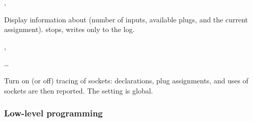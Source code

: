 \documentclass{l3in2edoc}
\begin{document}
\begin{function}[user]
  {
    \ShowSocket,
    \LogSocket
  }
  \begin{syntax}
     
  \end{syntax}
  Display information about  (number of inputs, available
  plugs, and the current assignment).  stops,
   writes only to the log.
\end{function}


\begin{function}[user]
  {
    \DebugSocketsOn,
    \DebugSocketsOff
  }
  \begin{syntax}
     \ldots{} 
  \end{syntax}
  Turn on (or off) tracing of sockets: declarations, plug assignments,
  and uses of sockets are then reported. The setting is global.
\end{function}




\subsubsection{Low-level programming}
\end{document}
